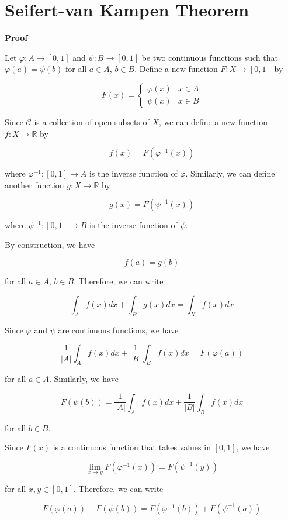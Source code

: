 \documentclass{sazuko}
\begin{document}
\lipsum[1-5]

\togglelayout

\section{Seifert-van Kampen Theorem}

\textbf{Proof}

Let $\varphi: A \to [0, 1]$ and $\psi: B \to [0, 1]$
be two continuous functions such that $\varphi(a) = \psi(b)$ for all $a \in A$, $b \in B$. Define a new
function $F: X \to [0, 1]$ by

$$F(x) = \begin{cases} \varphi(x) & x \in A \\
\psi(x) & x \in B \end{cases}$$

Since $\mathcal{C}$ is a collection of open subsets
of $X$, we can define a new function $f: X \to \mathbb{R}$ by

$$f(x) = F(\varphi^{-1}(x))$$

where $\varphi^{-1}: [0, 1] \to A$ is the inverse
function of $\varphi$. Similarly, we can define
another function $g: X \to \mathbb{R}$ by

$$g(x) = F(\psi^{-1}(x))$$

where $\psi^{-1}: [0, 1] \to B$ is the inverse
function of $\psi$.

By construction, we have

$$f(a) = g(b)$$

for all $a \in A$, $b \in B$. Therefore, we can write

$$\int_A f(x) dx + \int_B g(x) dx = \int_X f(x) dx$$

Since $\varphi$ and $\psi$ are continuous functions,
we have

$$\frac{1}{|A|} \int_A f(x) dx + \frac{1}{|B|} \int_B
f(x) dx = F(\varphi(a))$$

for all $a \in A$. Similarly, we have

$$F(\psi(b)) = \frac{1}{|A|} \int_A f(x) dx + \frac{1}{|B|} \int_B f(x) dx$$

for all $b \in B$.

Since $F(x)$ is a continuous function that takes values in $[0, 1]$, we
have

$$\lim_{x \to y} F(\varphi^{-1}(x)) = F(\psi^{-1}(y))$$

for all $x, y \in [0, 1]$. Therefore, we can write

$$F(\varphi(a)) + F(\psi(b)) = F(\varphi^{-1}(b)) + F(\psi^{-1}(a))$$
\end{document}

